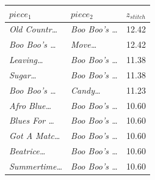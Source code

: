 \begin{tabular}{llr}
\toprule
$piece_1$ & $piece_2$ & $z_{stitch}$ \\
\midrule
\textit{Old Countr\dots} & \textit{Boo Boo's \dots} & 12.42 \\
\textit{Boo Boo's \dots} & \textit{Move\dots} & 12.42 \\
\textit{Leaving\dots} & \textit{Boo Boo's \dots} & 11.38 \\
\textit{Sugar\dots} & \textit{Boo Boo's \dots} & 11.38 \\
\textit{Boo Boo's \dots} & \textit{Candy\dots} & 11.23 \\
\textit{Afro Blue\dots} & \textit{Boo Boo's \dots} & 10.60 \\
\textit{Blues For \dots} & \textit{Boo Boo's \dots} & 10.60 \\
\textit{Got A Matc\dots} & \textit{Boo Boo's \dots} & 10.60 \\
\textit{Beatrice\dots} & \textit{Boo Boo's \dots} & 10.60 \\
\textit{Summertime\dots} & \textit{Boo Boo's \dots} & 10.60 \\
\bottomrule
\end{tabular}
